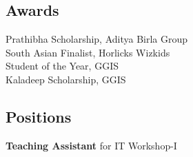 \documentclass[]{deedy-resume-openfont}
\begin{document}
\begin{minipage}[t]{0.33\textwidth}
\subsection{Awards}
Prathibha Scholarship, Aditya Birla Group \\
South Asian Finalist, Horlicks Wizkids \\
Student of the Year, GGIS \\
Kaladeep Scholarship, GGIS
\sectionsep

\subsection{Positions}
\textbf{Teaching Assistant} for IT Workshop-I

%
%

\end{minipage} 
\hfill
\end{document}
